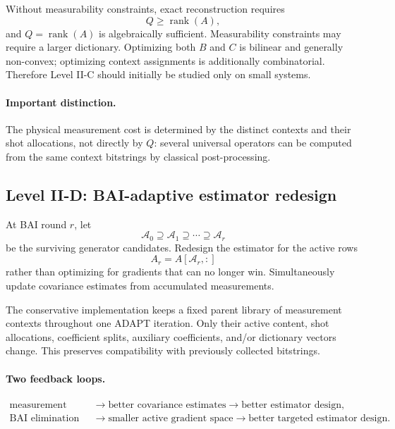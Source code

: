 \documentclass[11pt]{article}
\newcommand{\rank}{\operatorname{rank}}
\newcommand{\Aset}{\mathcal A}
\begin{document}
Without measurability constraints, exact reconstruction requires
\begin{equation}
  Q\ge \rank(A),
\end{equation}
and $Q=\rank(A)$ is algebraically sufficient.  Measurability constraints may require a larger dictionary.  Optimizing both $B$ and $C$ is bilinear and generally non-convex; optimizing context assignments is additionally combinatorial.  Therefore Level II-C should initially be studied only on small systems.

\paragraph{Important distinction.}
The physical measurement cost is determined by the distinct contexts and their shot allocations, not directly by $Q$: several universal operators can be computed from the same context bitstrings by classical post-processing.

\subsection{Level II-D: BAI-adaptive estimator redesign}

At BAI round $r$, let
\begin{equation}
  \Aset_0\supseteq\Aset_1\supseteq\cdots\supseteq\Aset_r
\end{equation}
be the surviving generator candidates.  Redesign the estimator for the active rows
\begin{equation}
  A_r=A[\Aset_r,:]
\end{equation}
rather than optimizing for gradients that can no longer win.  Simultaneously update covariance estimates from accumulated measurements.

The conservative implementation keeps a fixed parent library of measurement contexts throughout one ADAPT iteration.  Only their active content, shot allocations, coefficient splits, auxiliary coefficients, and/or dictionary vectors change.  This preserves compatibility with previously collected bitstrings.

\paragraph{Two feedback loops.}
\begin{align}
  \text{measurement data}
  &\longrightarrow \text{better covariance estimates}
  \longrightarrow \text{better estimator design},\\
  \text{BAI elimination}
  &\longrightarrow \text{smaller active gradient space}
  \longrightarrow \text{better targeted estimator design}.
\end{align}
\end{document}
